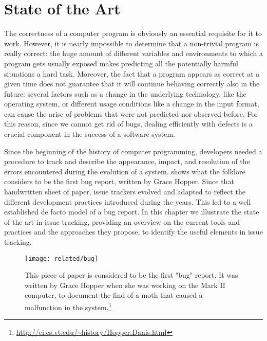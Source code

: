 
\chapter{State of the Art}\label{ch:related}



The correctness of a computer program is obviously an essential requisite for it to work.
However, it is nearly impossible to determine that a non-trivial program is really correct: the huge amount of different variables and environments to which a program gets usually exposed makes predicting all the potentially harmful situations a hard task.
Moreover, the fact that a program appears as correct at a given time does not guarantee that it will continue behaving correctly also in the future: several factors such as a change in the underlying technology, like the operating system, or different usage conditions like a change in the input format, can cause the arise of problems that were not predicted nor observed before.
For this reason, since we cannot get rid of bugs, dealing efficiently with defects is a crucial component in the success of a software system.

Since the beginning of the history of computer programming, developers needed a procedure to track and describe the appearance, impact, and resolution of the errors encountered during the evolution of a system.
 shows what the folklore considers to be the first bug report, written by Grace Hopper.
Since that handwritten sheet of paper, issue trackers evolved and adapted to reflect the different development practices introduced during the years.
This led to a well established de facto model of a bug report.
In this chapter we illustrate the state of the art in issue tracking, providing an overview on the current tools and practices and the approaches they propose, to identify the useful elements in issue tracking.

\begin{figure}[t]
\centering
  \texttt{[image: related/bug]}
  \caption[The first "bug" report.]{This piece of paper is considered to be the first "bug" report. It was written by Grace Hopper when she was working on the Mark II computer, to document the find of a moth that caused a malfunction in the system.\footnote{\url{http://ei.cs.vt.edu/~history/Hopper.Danis.html}}}
  \label{fig:first-bug-report}
\end{figure}




